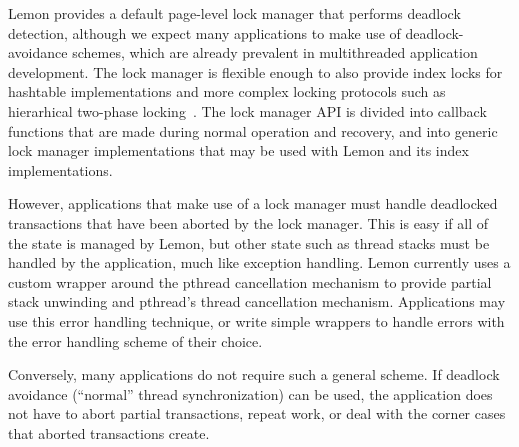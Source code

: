 \documentclass[10pt,letterpaper,twocolumn,english]{article}
\newcommand{\yad}{Lemon\xspace}
\begin{document}
 \yad provides a default page-level lock manager that performs deadlock
detection, although we expect many applications to make use of
deadlock-avoidance schemes, which are already prevalent in
multithreaded application development.  The lock manager is flexible
enough to also provide index locks for hashtable implementations and 
more complex locking protocols such as hierarhical two-phase 
locking~\cite{hierarcicalLocking,ariesim}.  
The lock manager API is divided into callback functions that are made 
during normal operation and recovery, and into generic lock manager 
implementations that may be used with \yad and its index implementations.



However, applications that
make use of a lock manager must handle deadlocked transactions
that have been aborted by the lock manager.  This is easy if all of
the state is managed by \yad, but other state such as thread stacks
must be handled by the application, much like exception handling.  
\yad currently uses a custom wrapper around the pthread cancellation 
mechanism to provide partial stack unwinding and pthread's thread
cancellation mechanism.  Applications may use this error handling 
technique, or write simple wrappers to handle errors with the 
error handling scheme of their choice.

Conversely, many applications do not require such a general scheme.
If deadlock avoidance (``normal'' thread synchronization) can be used,
the application does not have to abort partial transactions, repeat
work, or deal with the corner cases that aborted transactions create.



\end{document}
